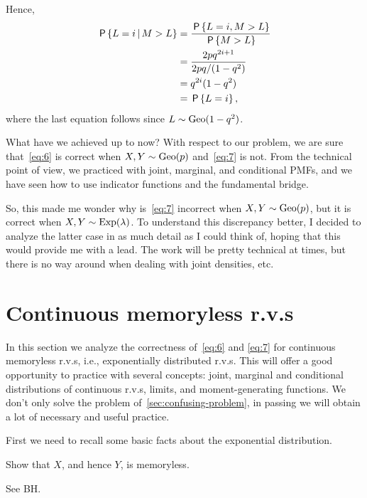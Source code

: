 \documentclass[a4paper,11pt]{article}
\begin{document}
\begin{exercise}
\begin{solution}
Hence, 
\begin{align}
\,\mathsf{P}\left\{L=i\,\middle|\, M > L\right\} 
&=\frac{\,\mathsf{P}\left\{L=i, M > L\right\}}{\,\mathsf{P}\left\{M>L\right\}} \\
&=\frac{2p q^{2i+1}}{2pq/(1-q^2)} \\
&=q^{2i}(1-q^2) \\
&= \,\mathsf{P}\left\{L=i\right\},
\end{align}
where the last equation follows since $L\sim \mathrm{Geo}(1-q^2)$.

\end{solution}
\end{exercise}


What have we achieved up to now? With respect to our problem, we are sure that~\eqref{eq:6} is correct when $X, Y \sim \mathrm{Geo}(p)$ and~\cref{eq:7} is not.
From the technical point of view, we practiced with joint, marginal, and conditional PMFs, and we have seen how to use indicator functions and the fundamental bridge.

So, this made me wonder why is~\eqref{eq:7} incorrect when $X, Y\sim\mathrm{Geo}(p)$, but it is correct when $X,Y\sim\mathrm{Exp}(\lambda)$.
To understand this discrepancy better, I decided to analyze the latter case in as much detail as I could think of, hoping that this would  provide me with a lead.
The work will be pretty technical at times, but there is no way around when dealing with joint densities, etc.



\section{Continuous memoryless r.v.s}
\label{sec:exerc-expon-distr}

In this section we analyze the correctness of~\cref{eq:6} and \cref{eq:7} for continuous memoryless r.v.s, i.e., exponentially distributed r.v.s.
This will offer a good opportunity to practice with several concepts: joint, marginal and conditional distributions of continuous r.v.s,  limits, and moment-generating functions.
We don't only solve the problem of~\cref{sec:confusing-problem}, in passing we will obtain a lot of necessary and useful practice.

First we need to recall some basic facts about the exponential distribution.

\begin{exercise}
Show that $X$, and hence $Y$, is memoryless.
\begin{solution}
  See BH.
\end{solution}
\end{exercise}
\end{document}
